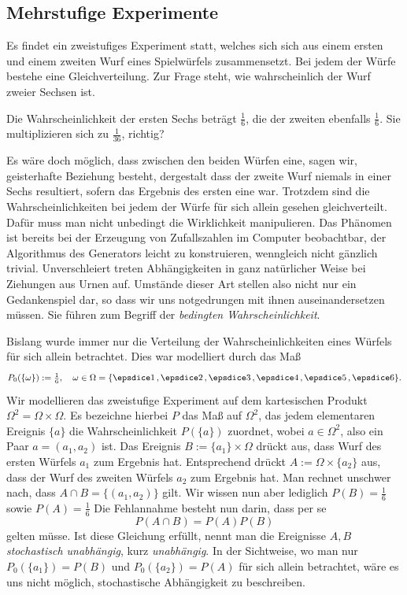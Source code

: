 \subsection{Mehrstufige Experimente}

Es findet ein zweistufiges Experiment statt, welches sich sich
aus einem ersten und einem zweiten Wurf eines Spielwürfels
zusammensetzt. Bei jedem der Würfe bestehe eine Gleichverteilung.
Zur Frage steht, wie wahrscheinlich der Wurf zweier Sechsen ist.

Die Wahrscheinlichkeit der ersten Sechs beträgt $\tfrac{1}{6}$,
die der zweiten ebenfalls $\tfrac{1}{6}$. Sie multiplizieren sich
zu $\tfrac{1}{36}$, richtig?

Es wäre doch möglich, dass zwischen den beiden Würfen eine,
sagen wir, geisterhafte Beziehung besteht, dergestalt dass
der zweite Wurf niemals in einer Sechs resultiert, sofern das
Ergebnis des ersten eine war. Trotzdem sind die Wahrscheinlichkeiten bei
jedem der Würfe für sich allein gesehen gleichverteilt. Dafür muss man
nicht unbedingt die Wirklichkeit manipulieren. Das Phänomen ist bereits
bei der Erzeugung von Zufallszahlen im Computer beobachtbar, der Algorithmus
des Generators leicht zu konstruieren, wenngleich nicht gänzlich
trivial. Unverschleiert treten Abhängigkeiten in ganz natürlicher Weise
bei Ziehungen aus Urnen auf. Umstände dieser Art stellen also
nicht nur ein Gedankenspiel dar, so dass wir uns notgedrungen mit ihnen
auseinandersetzen müssen. Sie führen zum Begriff der
\emph{bedingten Wahrscheinlichkeit}.

Bislang wurde immer nur die Verteilung der Wahrscheinlichkeiten eines
Würfels für sich allein betrachtet. Dies war modelliert durch das Maß
\[P_0(\{\omega\}):=\tfrac{1}{6},\quad
\omega\in\Omega=\{\dicesp{1},\dicesp{2},\dicesp{3},\dicesp{4},\dicesp{5},\dice{6}\}.\]
Wir modellieren das zweistufige Experiment auf dem kartesischen
Produkt $\Omega^2 = \Omega\times\Omega$. Es bezeichne hierbei $P$ das
Maß auf $\Omega^2$, das jedem elementaren Ereignis $\{a\}$ die
Wahrscheinlichkeit $P(\{a\})$ zuordnet, wobei $a\in\Omega^2$,
also ein Paar $a = (a_1,a_2)$ ist. Das Ereignis $B:=\{a_1\}\times\Omega$
drückt aus, dass Wurf des ersten Würfels $a_1$ zum Ergebnis hat.
Entsprechend drückt $A:=\Omega\times\{a_2\}$ aus, dass der Wurf des
zweiten Würfels $a_2$ zum Ergebnis hat. Man rechnet unschwer nach, dass
$A\cap B=\{(a_1,a_2)\}$ gilt. Wir wissen nun aber lediglich
$P(B) = \tfrac{1}{6}$ sowie $P(A) = \tfrac{1}{6}$
Die Fehlannahme besteht nun darin, dass per se
\[P(A\cap B) = P(A)P(B)\]
gelten müsse. Ist diese Gleichung erfüllt, nennt man die Ereignisse
$A,B$ \emph{stochastisch unabhängig}, kurz \emph{unabhängig}. In der
Sichtweise, wo man nur $P_0(\{a_1\})=P(B)$ und $P_0(\{a_2\})=P(A)$
für sich allein betrachtet, wäre es uns nicht möglich, stochastische
Abhängigkeit zu beschreiben.

